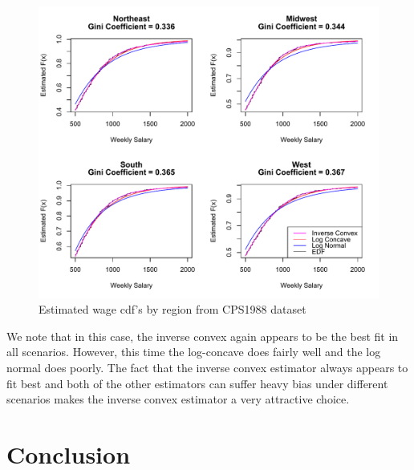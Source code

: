 \documentclass[11pt]{article}
\numberwithin{equation}{section}
\begin{document}
	\begin{figure}[H]
	\centerline{\includegraphics[width = 14cm]{IndividualRegions.pdf} }
	\caption{Estimated wage cdf's by region from CPS1988 dataset}
	\end{figure} 	
	
	We note that in this case, the inverse convex again appears to be the best fit in all scenarios. However, this time the log-concave does fairly well and the log normal does  poorly. The fact that the inverse convex estimator always appears to fit best and both of the other estimators can suffer heavy bias under different scenarios makes the inverse convex estimator a very attractive choice. 
	
{\section{Conclusion} }
\end{document}
